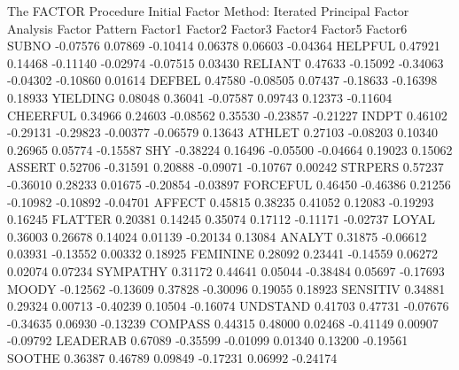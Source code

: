 \documentclass{article}
\begin{document}
\begin{Woutput}
The FACTOR Procedure
Initial Factor Method: Iterated Principal Factor Analysis
                                          Factor Pattern
                Factor1        Factor2        Factor3        Factor4        Factor5        Factor6
SUBNO          -0.07576        0.07869       -0.10414        0.06378        0.06603       -0.04364
HELPFUL         0.47921        0.14468       -0.11140       -0.02974       -0.07515        0.03430
RELIANT         0.47633       -0.15092       -0.34063       -0.04302       -0.10860        0.01614
DEFBEL          0.47580       -0.08505        0.07437       -0.18633       -0.16398        0.18933
YIELDING        0.08048        0.36041       -0.07587        0.09743        0.12373       -0.11604
CHEERFUL        0.34966        0.24603       -0.08562        0.35530       -0.23857       -0.21227
INDPT           0.46102       -0.29131       -0.29823       -0.00377       -0.06579        0.13643
ATHLET          0.27103       -0.08203        0.10340        0.26965        0.05774       -0.15587
SHY            -0.38224        0.16496       -0.05500       -0.04664        0.19023        0.15062
ASSERT          0.52706       -0.31591        0.20888       -0.09071       -0.10767        0.00242
STRPERS         0.57237       -0.36010        0.28233        0.01675       -0.20854       -0.03897
FORCEFUL        0.46450       -0.46386        0.21256       -0.10982       -0.10892       -0.04701
AFFECT          0.45815        0.38235        0.41052        0.12083       -0.19293        0.16245
FLATTER         0.20381        0.14245        0.35074        0.17112       -0.11171       -0.02737
LOYAL           0.36003        0.26678        0.14024        0.01139       -0.20134        0.13084
ANALYT          0.31875       -0.06612        0.03931       -0.13552        0.00332        0.18925
FEMININE        0.28092        0.23441       -0.14559        0.06272        0.02074        0.07234
SYMPATHY        0.31172        0.44641        0.05044       -0.38484        0.05697       -0.17693
MOODY          -0.12562       -0.13609        0.37828       -0.30096        0.19055        0.18923
SENSITIV        0.34881        0.29324        0.00713       -0.40239        0.10504       -0.16074
UNDSTAND        0.41703        0.47731       -0.07676       -0.34635        0.06930       -0.13239
COMPASS         0.44315        0.48000        0.02468       -0.41149        0.00907       -0.09792
LEADERAB        0.67089       -0.35599       -0.01099        0.01340        0.13200       -0.19561
SOOTHE          0.36387        0.46789        0.09849       -0.17231        0.06992       -0.24174

\end{Woutput}
\end{document}
